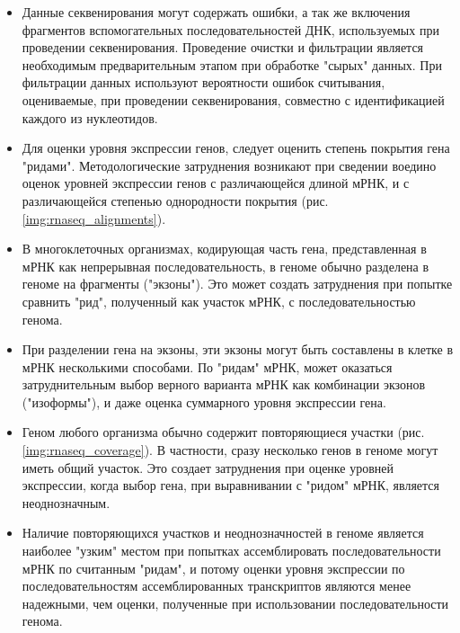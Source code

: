 \begin{itemize}

\item Данные секвенирования могут содержать ошибки, а так же включения фрагментов вспомогательных последовательностей ДНК, используемых при проведении секвенирования. Проведение очистки и фильтрации является необходимым предварительным этапом при обработке "сырых" данных. При фильтрации данных используют вероятности ошибок считывания, оцениваемые, при проведении секвенирования, совместно с идентификацией каждого из нуклеотидов.

\item Для оценки уровня экспрессии генов, следует оценить степень покрытия гена "ридами". Методологические затруднения возникают при сведении воедино оценок уровней экспрессии генов с различающейся длиной мРНК, и с различающейся степенью однородности покрытия (рис. \ref{img:rnaseq_alignments}).

\item В многоклеточных организмах, кодирующая часть гена, представленная в мРНК как непрерывная последовательность, в геноме обычно разделена в геноме на фрагменты ("экзоны"). Это может создать затруднения при попытке сравнить "рид", полученный как участок мРНК, с последовательностью генома.

\item При разделении гена на экзоны, эти экзоны могут быть составлены в клетке в мРНК несколькими способами. По "ридам" мРНК, может оказаться затруднительным выбор верного варианта мРНК как комбинации экзонов ("изоформы"), и даже оценка суммарного уровня экспрессии гена.

\item Геном любого организма обычно содержит повторяющиеся участки (рис. \ref{img:rnaseq_coverage}). В частности, сразу несколько генов в геноме могут иметь общий участок. Это создает затруднения при оценке уровней экспрессии, когда выбор гена, при выравнивании с "ридом" мРНК, является неоднозначным.

\item Наличие повторяющихся участков и неоднозначностей в геноме является наиболее "узким" местом при попытках ассемблировать последовательности мРНК по считанным "ридам", и потому оценки уровня экспрессии по последовательностям ассемблированных транскриптов являются менее надежными, чем оценки, полученные при использовании последовательности генома.

\end{itemize}


